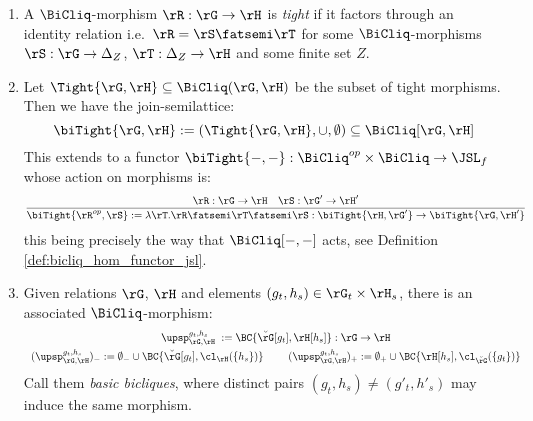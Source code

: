 \documentclass{article}
\begin{document}
\smallskip

\begin{definition}
\label{def:tight_bicliq_mor}
\item
\begin{enumerate}
\item
A $\BiCliq$-morphism $\rR : \rG \to \rH$ is \emph{tight} if it factors through an identity relation i.e.\ $\rR = \rS \fatsemi \rT$ for some $\BiCliq$-morphisms $\rS : \rG \to \Delta_Z$, $\rT : \Delta_Z \to \rH$ and some finite set $Z$.

\item
Let $\Tight{\rG,\rH} \subseteq \BiCliq(\rG,\rH)$ be the subset of tight morphisms. Then we have the join-semilattice:
\[
\biTight{\rG,\rH} := (\Tight{\rG,\rH},\cup,\emptyset) \subseteq \BiCliq[\rG,\rH]
\]
This extends to a functor $\biTight{-,-} : \BiCliq^{op} \times \BiCliq \to \JSL_f$ whose action on morphisms is:
\[
\dfrac{\rR : \rG \to \rH \quad \rS : \rG' \to \rH'}
{\biTight{\rR^{op},\rS} := \lambda \rT. \rR \fatsemi \rT \fatsemi \rS : \biTight{\rH,\rG'} \to \biTight{\rG,\rH'}}
\]
this being precisely the way that $\BiCliq[-,-]$ acts, see Definition \ref{def:bicliq_hom_functor_jsl}.

\item
Given relations $\rG$, $\rH$ and elements $(g_t,h_s) \in \rG_t \times \rH_s$, there is an associated $\BiCliq$-morphism:
\[
\begin{tabular}{c}
$\upsp_{\rG,\rH}^{g_t,h_s} \; := \BC{\breve{\rG}[g_t],\rH[h_s]} : \rG \to \rH$
\\[1ex]
$(\upsp_{\rG,\rH}^{g_t,h_s})_- := \emptyset_- \cup \BC{\breve{\rG}[g_t],\cl_\rH(\{h_s\})}$
\qquad
$(\upsp_{\rG,\rH}^{g_t,h_s})_+ := \emptyset_+ \cup \BC{\rH[h_s],\cl_{\breve{\rG}}(\{g_t\})}$
\end{tabular}
\]
Call them \emph{basic bicliques}, where distinct pairs $(g_t,h_s) \neq (g'_t,h'_s)$ may induce the same morphism. 


\end{enumerate}
\end{definition}
\end{document}

